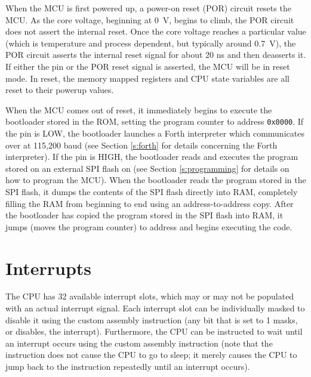\documentclass[11pt,pdftex,portrait,letterpaper]{article}
\begin{document}
When the MCU is first powered up, a power-on reset (POR) circuit resets the MCU. As the core voltage, beginning at 0~V, begins to climb, the POR circuit does not assert the internal reset. Once the core voltage reaches a particular value (which is temperature and process dependent, but typically around 0.7~V), the POR circuit asserts the internal reset signal for about 20 ns and then deasserts it. If either the  pin or the POR reset signal is asserted, the MCU will be in reset mode. In reset, the memory mapped registers and CPU state variables are all reset to their powerup values.

When the MCU comes out of reset, it immediately begins to execute the bootloader stored in the ROM, setting the program counter to address \texttt{0x0000}. If the  pin is LOW, the bootloader launches a Forth interpreter which communicates over  at 115,200 baud (see Section \ref{s:forth} for details concerning the Forth interpreter). If the  pin is HIGH, the bootloader reads and executes the program stored on an external SPI flash on  (see Section \ref{s:programming} for details on how to program the MCU). When the bootloader reads the program stored in the SPI flash, it dumps the contents of the SPI flash directly into RAM, completely filling the RAM from beginning to end using an address-to-address copy. After the bootloader has copied the program stored in the SPI flash into RAM, it jumps (moves the program counter) to address \texttt{\RamProgramStartAddress} and begins executing the code.

\newpage



\section{Interrupts} \label{s:interrupts}



The CPU has 32 available interrupt slots, which may or may not be populated with an actual interrupt signal. Each interrupt slot can be individually masked to disable it using the custom  assembly instruction (any bit that is set to 1 masks, or disables, the interrupt). Furthermore, the CPU can be instructed to wait until an interrupt occurs using the custom  assembly instruction (note that the  instruction does not cause the CPU to go to sleep; it merely causes the CPU to jump back to the  instruction repeatedly until an interrupt occurs).
\end{document}
